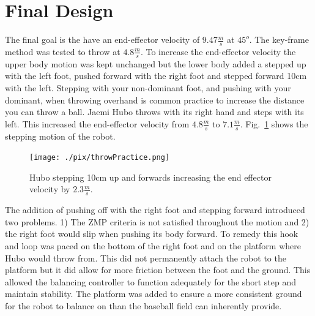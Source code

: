\section{Final Design}\label{sec:finalDesign}

The final goal is the have an end-effector velocity of $9.47\frac{m}{s}$ at $45^o$.  
The key-frame method was tested to throw at $4.8\frac{m}{s}$.  
To increase the end-effector velocity the upper body motion was kept unchanged but the lower body added a stepped up with the left foot, pushed forward with the right foot and stepped forward 10cm with the left.  
Stepping with your non-dominant foot, and pushing with your dominant, when throwing overhand is common practice to increase the distance you can throw a ball.  
Jaemi Hubo throws with its right hand and steps with its left.  
This increased the end-effector velocity from $4.8\frac{m}{s}$ to $7.1\frac{m}{s}$.
Fig.~\ref{fig:hubo-step} shows the stepping motion of the robot.

\begin{figure}[t]
  \centering
\texttt{[image: ./pix/throwPractice.png]}
  \caption{Hubo stepping 10cm up and forwards increasing the end effector velocity by $2.3\frac{m}{s}$.}
  \label{fig:hubo-step}
\end{figure}

The addition of pushing off with the right foot and stepping forward introduced two problems.  1) The ZMP criteria is not satisfied throughout the motion and 2) the right foot would slip when pushing its body forward.  
To remedy this hook and loop was paced on the bottom of the right foot and on the platform where Hubo would throw from.  
This did not permanently attach the robot to the platform but it did allow for more friction between the foot and the ground.
This allowed the balancing controller to function adequately for the short step and maintain stability.
The platform was added to ensure a more consistent ground for the robot to balance on than the baseball field can inherently provide.

